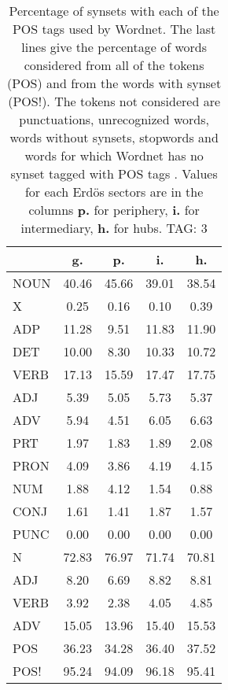\begin{table}[h!]
\begin{center}
\begin{tabular}{| l || c | c | c | c |}\hline
 & {\bf g.} & {\bf p.} & {\bf i.} & {\bf h.} \\\hline\hline
NOUN & 40.46  & 45.66  & 39.01  & 38.54 \\
X & 0.25  & 0.16  & 0.10  & 0.39 \\\hline
ADP & 11.28  & 9.51  & 11.83  & 11.90 \\
DET & 10.00  & 8.30  & 10.33  & 10.72 \\\hline
VERB & 17.13  & 15.59  & 17.47  & 17.75 \\\hline
ADJ & 5.39  & 5.05  & 5.73  & 5.37 \\
ADV & 5.94  & 4.51  & 6.05  & 6.63 \\\hline
PRT & 1.97  & 1.83  & 1.89  & 2.08 \\
PRON & 4.09  & 3.86  & 4.19  & 4.15 \\
NUM & 1.88  & 4.12  & 1.54  & 0.88 \\
CONJ & 1.61  & 1.41  & 1.87  & 1.57 \\
PUNC & 0.00  & 0.00  & 0.00  & 0.00 \\\hline\hline\hline
N & 72.83  & 76.97  & 71.74  & 70.81 \\\hline
ADJ & 8.20  & 6.69  & 8.82  & 8.81 \\\hline
VERB & 3.92  & 2.38  & 4.05  & 4.85 \\\hline
ADV & 15.05  & 13.96  & 15.40  & 15.53 \\\hline\hline
POS & 36.23  & 34.28  & 36.40  & 37.52 \\\hline
POS! & 95.24  & 94.09  & 96.18  & 95.41 \\\hline
\end{tabular}
\caption{Percentage of synsets with each of the POS tags used by Wordnet. The last lines give the percentage of words considered from all of the tokens (POS) and from the words with synset (POS!). The tokens not considered are punctuations, unrecognized words, words without synsets, stopwords and words for which Wordnet has no synset  tagged with POS tags . Values for each Erd\"os sectors are in the columns {{\bf p.}} for periphery, {{\bf i.}} for intermediary, {{\bf h.}} for hubs. TAG: 3}
\end{center}
\end{table}
